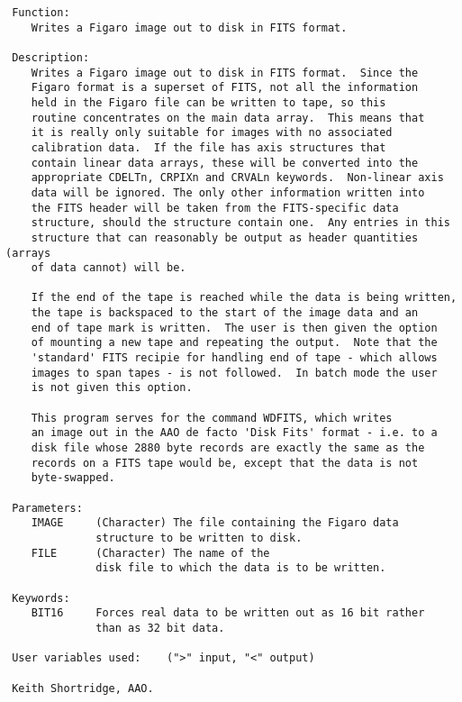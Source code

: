 \begin{description}
\begin{verbatim}
 Function:
    Writes a Figaro image out to disk in FITS format.

 Description:
    Writes a Figaro image out to disk in FITS format.  Since the
    Figaro format is a superset of FITS, not all the information
    held in the Figaro file can be written to tape, so this
    routine concentrates on the main data array.  This means that
    it is really only suitable for images with no associated
    calibration data.  If the file has axis structures that
    contain linear data arrays, these will be converted into the
    appropriate CDELTn, CRPIXn and CRVALn keywords.  Non-linear axis
    data will be ignored. The only other information written into
    the FITS header will be taken from the FITS-specific data
    structure, should the structure contain one.  Any entries in this
    structure that can reasonably be output as header quantities (arrays
    of data cannot) will be.

    If the end of the tape is reached while the data is being written,
    the tape is backspaced to the start of the image data and an
    end of tape mark is written.  The user is then given the option
    of mounting a new tape and repeating the output.  Note that the
    'standard' FITS recipie for handling end of tape - which allows
    images to span tapes - is not followed.  In batch mode the user
    is not given this option.

    This program serves for the command WDFITS, which writes
    an image out in the AAO de facto 'Disk Fits' format - i.e. to a
    disk file whose 2880 byte records are exactly the same as the
    records on a FITS tape would be, except that the data is not
    byte-swapped.

 Parameters:
    IMAGE     (Character) The file containing the Figaro data
              structure to be written to disk.
    FILE      (Character) The name of the
              disk file to which the data is to be written.

 Keywords:
    BIT16     Forces real data to be written out as 16 bit rather
              than as 32 bit data.

 User variables used:    (">" input, "<" output)

 Keith Shortridge, AAO.
\end{verbatim}
\end{description}
